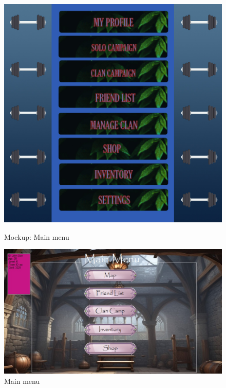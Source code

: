 \begin{figure}[h]
    \centering
    \begin{minipage}[b]{0.45\textwidth}
        \centering
    \includegraphics[width=\textwidth]{omockup3.jpg}
    \caption{Mockup: Main menu}
    \end{minipage}
    \hfill
    \begin{minipage}[b]{0.45\textwidth}
        \centering
    \includegraphics[width=\textwidth]{mockup3.jpg}
    \caption{Main menu}
    \end{minipage}
\end{figure}



